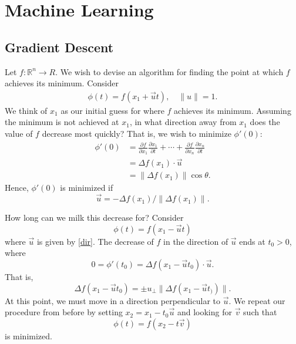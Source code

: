 \documentclass[12pt]{amsbook}
\newcommand{\rr}{\mathbb{R}}
\theoremstyle{plain}
\theoremstyle{definition}
\theoremstyle{remark}
\numberwithin{equation}{section}  %
\numberwithin{equation}{section}  %
\begin{document}
\newpage
\part{Machine Learning}
\chapter{Gradient Descent}

Let $f: \rr^{n} \to R$. We wish to devise an algorithm for finding the point at
which $f$ achieves its minimum. Consider
\begin{equation*}
\begin{split}
	\phi(t) = f(x_{1} + \vec{u}t), \quad \| u \| = 1.
\end{split}
\end{equation*}
We think of $x_{1}$ as our initial guess for where $f$ achieves its minimum.
Assuming the minimum is not achieved at $x_{1}$, in what direction away from
$x_{1}$ does the value of $f$ decrease most quickly? That is, we wish to
minimize $\phi'(0)$:
\begin{equation}
	\label{dir}
	\begin{split}
	\phi '(0) & = \frac{\partial f}{\partial x_{1}} \frac{\partial
		x_{1}}{\partial t} +\cdots + \frac{\partial f}{\partial x_{n}} \frac{\partial
		x_{n}}{\partial t} \\
		& = \Delta f(x_{1}) \cdot \vec{u} \\
		& = \| \Delta f (x_{1}) \| \cos \theta.
	\end{split}
\end{equation}
Hence, $\phi '(0)$ is minimized if
\begin{equation*}
	\vec{u} = -\Delta f(x_{1}) / \| \Delta f (x_{1}) \|.
\end{equation*}

How long can we milk this decrease for? Consider
\begin{equation*}
	\phi(t) = f(x_{1} - \vec{u} t)
\end{equation*}
where $\vec{u}$ is given by \eqref{dir}. The decrease of $f$ in the direction of
$\vec{u}$ ends at $t_{0} > 0$, where
\begin{equation*}
	0 = \phi'(t_{0}) = \Delta f(x_{1} - \vec{u}t_{0}) \cdot \vec{u}.
\end{equation*}
That is,
\begin{equation*}
	\Delta f(x_{1} - \vec{u} t_{0}) = \pm u_{\perp} \| \Delta f(x_{1} -
	\vec{u}t_{)}) \|.
\end{equation*}
At this point, we must move in a direction perpendicular to $\vec{u}$. 
We repeat our procedure from before by setting $x_{2} = x_{1} - t_{0}
\vec{u}$ and looking for $\vec{v}$ such that
\begin{equation*}
	\phi(t) = f(x_{2} - t \vec{v})
\end{equation*}
is minimized. 
\end{document}

